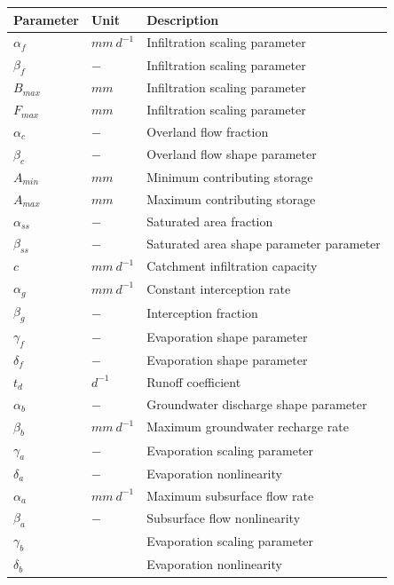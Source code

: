\begin{table}[htbp]
  \centering
    \begin{tabular}{lrl}
    \toprule
    Parameter & \multicolumn{1}{l}{Unit} & Description \\
    \midrule
    $\alpha_f$ & \multicolumn{1}{l}{$mm~d^{-1}$} & Infiltration scaling parameter \\
    $\beta_f$ & \multicolumn{1}{l}{$-$} & Infiltration scaling parameter \\
    $B_{max}$ & \multicolumn{1}{l}{$mm$} & Infiltration scaling parameter \\
    $F_{max}$ & \multicolumn{1}{l}{$mm$} & Infiltration scaling parameter \\
    $\alpha_c$ & \multicolumn{1}{l}{$-$} & Overland flow fraction \\
    $\beta_c$ & \multicolumn{1}{l}{$-$} & Overland flow shape parameter \\
    $A_{min}$ & \multicolumn{1}{l}{$mm$} & Minimum contributing storage \\
    $A_{max}$ & \multicolumn{1}{l}{$mm$} & Maximum contributing storage \\
    $\alpha_{ss}$ & \multicolumn{1}{l}{$-$} & Saturated area fraction \\
    $\beta_{ss}$ & \multicolumn{1}{l}{$-$} & Saturated area shape parameter parameter \\
    $c$   & \multicolumn{1}{l}{$mm~d^{-1}$} & Catchment infiltration capacity \\
    $\alpha_g$ & \multicolumn{1}{l}{$mm~d^{-1}$} & Constant interception rate \\
    $\beta_g$ & \multicolumn{1}{l}{$-$} & Interception fraction \\
    $\gamma_f$ & \multicolumn{1}{l}{$-$} & Evaporation shape parameter \\
    $\delta_f$ & \multicolumn{1}{l}{$-$} & Evaporation shape parameter \\
    $t_d$ & \multicolumn{1}{l}{$d^{-1}$} & Runoff coefficient \\
    $\alpha_b$ & \multicolumn{1}{l}{$-$} & Groundwater discharge shape parameter \\
    $\beta_b$ & \multicolumn{1}{l}{$mm~d^{-1}$} & Maximum groundwater recharge rate \\
    $\gamma_a$ & \multicolumn{1}{l}{$-$} & Evaporation scaling parameter \\
    $\delta_a$ & \multicolumn{1}{l}{$-$} & Evaporation nonlinearity \\
    $\alpha_a$ & \multicolumn{1}{l}{$mm~d^{-1}$} & Maximum subsurface flow rate \\
    $\beta_a$ & \multicolumn{1}{l}{$-$} & Subsurface flow nonlinearity  \\
    $\gamma_b$ &       & Evaporation scaling parameter \\
    $\delta_b$ &       & Evaporation nonlinearity \\
    \bottomrule
    \end{tabular}%
  \label{tab:addlabel}%
\end{table}%

